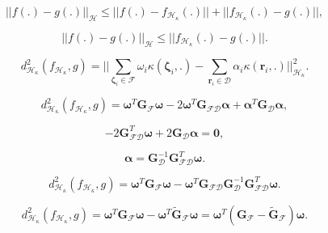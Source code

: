 \begin{equation}
    ||f(.) - g(.)||_\mathcal{H} \leq ||f(.) - f_{\mathcal{H}_\kappa}(.)|| + ||f_{\mathcal{H}_\kappa}(.) - g(.)||,
\end{equation}

\begin{equation}
    ||f(.) - g(.)||_\mathcal{H} \leq ||f_{\mathcal{H}_\kappa}(.) - g(.)||.
\end{equation}

\begin{equation}
    d_{\mathcal{H}_{\kappa}}^2(f_{\mathcal{H}_\kappa},g) = ||\sum_{\boldsymbol{\zeta}_i \in \mathcal{F}} \omega_i\kappa(\boldsymbol{\zeta}_i,.) - \sum_{\mathbf{r}_i \in \mathcal{D}} \alpha_i\kappa(\mathbf{r}_i,.)||_{\mathcal{H}_{\kappa}}^2.
\end{equation}

\begin{equation}
    d_{\mathcal{H}_{\kappa}}^2(f_{\mathcal{H}_\kappa},g)  = \boldsymbol{\omega}^{T}\mathbf{G}_{\mathcal{F}}\boldsymbol{\omega} - 2\boldsymbol{\omega}^{T}\mathbf{G}_{\mathcal{FD}}\boldsymbol{\alpha} + \boldsymbol{\alpha}^{T}\mathbf{G}_{\mathcal{D}}\boldsymbol{\alpha}, \label{eq:d2_Hk_vectorial}
\end{equation}

\begin{equation}
    -2\mathbf{G}_{\mathcal{FD}}^{T}\boldsymbol{\omega} + 2\mathbf{G}_{\mathcal{D}}\boldsymbol{\alpha} = \mathbf{0},
\end{equation}

\begin{equation}
    \boldsymbol{\alpha} = \mathbf{G}_{\mathcal{D}}^{-1}\mathbf{G}_{\mathcal{FD}}^{T}\boldsymbol{\omega}.\label{eq:alpha_Hk}
\end{equation}

\begin{equation}
    d_{\mathcal{H}_{\kappa}}^2(f_{\mathcal{H}_\kappa},g)  = \boldsymbol{\omega}^{T}\mathbf{G}_{\mathcal{F}}\boldsymbol{\omega} - \boldsymbol{\omega}^{T}\mathbf{G}_{\mathcal{FD}}\mathbf{G}_{\mathcal{D}}^{-1}\mathbf{G}_{\mathcal{FD}}^{T}\boldsymbol{\omega}.\label{eq:d2_Hk}
\end{equation}

\begin{equation}
    d_{\mathcal{H}_{\kappa}}^2(f_{\mathcal{H}_\kappa},g)  = \boldsymbol{\omega}^{T}\mathbf{G}_{\mathcal{F}}\boldsymbol{\omega} - \boldsymbol{\omega}^{T}\tilde{\mathbf{G}}_{\mathcal{F}}\boldsymbol{\omega} = \boldsymbol{\omega}^{T}(\mathbf{G}_{\mathcal{F}} - \tilde{\mathbf{G}}_{\mathcal{F}})\boldsymbol{\omega}.
\end{equation}


